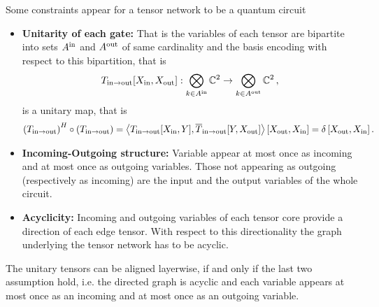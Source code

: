 \documentclass[aps,onecolumn,nofootinbib,pra]{article}
\begin{document}
    Some constraints appear for a tensor network to be a quantum circuit
    \begin{itemize}
        \item \textbf{Unitarity of each gate:} That is the variables of each tensor are bipartite into sets $A^{\mathrm{in}}$ and $A^{\mathrm{out}}$ of same cardinality and the basis encoding with respect to this bipartition, that is
        \begin{align*}
            T_{\mathrm{in} \rightarrow \mathrm{out}}[X_{\mathrm{in}},X_{\mathrm{out}}] : \bigotimes_{k\in A^{\mathrm{in}}} \mathbb{C}^2 \rightarrow \bigotimes_{k\in A^{\mathrm{out}}} \mathbb{C}^2  \, ,
        \end{align*}
        is a unitary map, that is
        \begin{align*}
            \left(T_{\mathrm{in} \rightarrow \mathrm{out}}\right)^H \circ \left(T_{\mathrm{in} \rightarrow \mathrm{out}}\right)
            = \left\langle 
                T_{\mathrm{in} \rightarrow \mathrm{out}}[X_{\mathrm{in}},Y],
                \overline{T}_{\mathrm{in} \rightarrow \mathrm{out}}[Y,X_{\mathrm{out}}]
            \right\rangle \left[ X_{\mathrm{out}},X_{\mathrm{in}} \right]
            = \delta\left[X_{\mathrm{out}},X_{\mathrm{in}}\right].
        \end{align*}
        \item \textbf{Incoming-Outgoing structure:} Variable appear at most once as incoming and at most once as outgoing variables.
        Those not appearing as outgoing (respectively as incoming) are the input and the output variables of the whole circuit.
        \item \textbf{Acyclicity:} Incoming and outgoing variables of each tensor core provide a direction of each edge tensor. With respect to this directionality the graph underlying the tensor network has to be acyclic.
    \end{itemize}

    The unitary tensors can be aligned layerwise, if and only if the last two assumption hold, i.e. the directed graph is acyclic and each variable appears at most once as an incoming and at most once as an outgoing variable.


\end{document}

